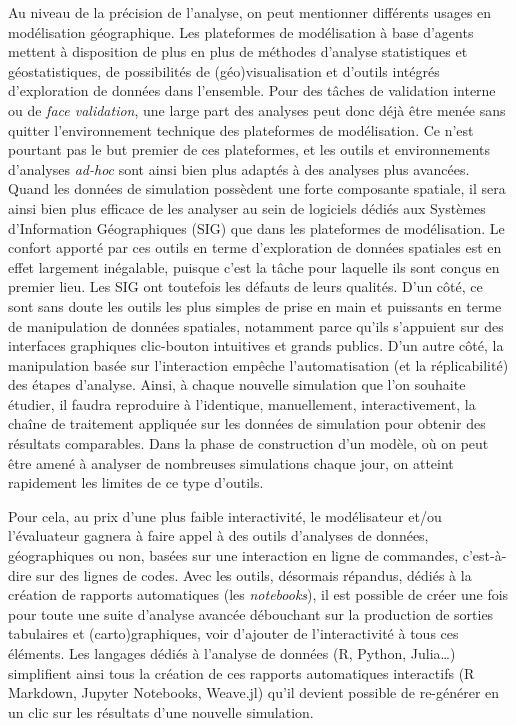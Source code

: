 \documentclass[a4paper, 12pt]{article}
\begin{document}
Au niveau de la précision de l'analyse, on peut mentionner différents usages en modélisation géographique.
Les plateformes de modélisation à base d'agents mettent à disposition de plus en plus de méthodes d'analyse statistiques et géostatistiques, de possibilités de (géo)visualisation et d'outils intégrés d'exploration de données dans l'ensemble.
Pour des tâches de validation interne ou de \textit{face validation}, une large part des analyses peut donc déjà être menée sans quitter l'environnement technique des plateformes de modélisation.
Ce n'est pourtant pas le but premier de ces plateformes, et les outils et environnements d'analyses \textit{ad-hoc} sont ainsi bien plus adaptés à des analyses plus avancées.
Quand les données de simulation possèdent une forte composante spatiale, il sera ainsi bien plus efficace de les analyser au sein de logiciels dédiés aux Systèmes d'Information Géographiques (SIG) que dans les plateformes de modélisation.
Le confort apporté par ces outils en terme d'exploration de données spatiales est en effet largement inégalable, puisque c'est la tâche pour laquelle ils sont conçus en premier lieu.
Les SIG ont toutefois les défauts de leurs qualités.
D'un côté, ce sont sans doute les outils les plus simples de prise en main et puissants en terme de manipulation de données spatiales, notamment parce qu'ils s'appuient sur des interfaces graphiques \og clic-bouton\fg{} intuitives et grands publics.
D'un autre côté, la manipulation basée sur l'interaction empêche l'automatisation (et la réplicabilité) des étapes d'analyse.
Ainsi, à chaque nouvelle simulation que l'on souhaite étudier, il faudra reproduire à l'identique, manuellement, interactivement, la chaîne de traitement appliquée sur les données de simulation pour obtenir des résultats comparables.
Dans la phase de construction d'un modèle, où on peut être amené à analyser de nombreuses simulations chaque jour, on atteint rapidement les limites de ce type d'outils.

Pour cela, au prix d'une plus faible interactivité, le modélisateur et/ou l'évaluateur gagnera à faire appel à des outils d'analyses de données, géographiques ou non, basées sur une interaction en ligne de commandes, c'est-à-dire sur des lignes de codes.
Avec les outils, désormais répandus, dédiés à la création de rapports automatiques (les \og \textit{notebooks}\fg{}), il est possible de créer une fois pour toute une suite d'analyse avancée débouchant sur la production de sorties tabulaires et (carto)graphiques, voir d'ajouter de l'interactivité à tous ces éléments.
Les langages dédiés à l'analyse de données (\textsf{R}, \textsf{Python}, \textsf{Julia}\ldots) simplifient ainsi tous la création de ces rapports automatiques interactifs (\og \textsf{R Markdown}\fg{}, \og \textsf{Jupyter Notebooks}\fg{}, \og \textsf{Weave.jl}\fg{}) qu'il devient possible de re-générer en un clic sur les résultats d'une nouvelle simulation.
\end{document}

